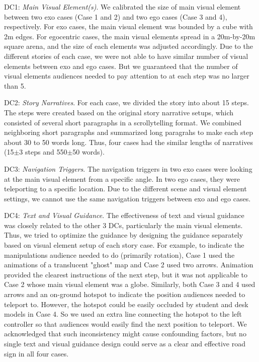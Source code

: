 {DC1: \textit{Main Visual Element(s)}. We calibrated the size of main visual element between two exo cases (Case 1 and 2) and two ego cases (Case 3 and 4), respectively. For exo cases, the main visual element was bounded by a cube with 2m edges. For egocentric cases, the main visual elements spread in a 20m-by-20m square arena, and the size of each elements was adjusted accordingly. Due to the different stories of each case, we were not able to have similar number of visual elements between exo and ego cases. But we guaranteed that the number of visual elements audiences needed to pay attention to at each step was no larger than 5.}

{DC2: \textit{Story Narratives}. For each case, we divided the story into about 15 steps. The steps were created based on the original story narrative setups, which consisted of several short paragraphs in a scrollytelling format. We combined neighboring short paragraphs and summarized long paragrahs to make each step about 30 to 50 words long. Thus, four cases had the similar lengths of narratives (15$\pm$3 steps and 550$\pm$50 words).}

{DC3: \textit{Navigation Triggers}. The navigation triggers in two exo cases were looking at the main visual element from a specific angle. In two ego cases, they were teleporting to a specific location. Due to the different scene and visual element settings, we cannot use the same navigation triggers between exo and ego cases.}

{DC4: \textit{Text and Visual Guidance}. The effectiveness of text and visual guidance was closely related to the other 3 DCs, particularly the main visual elements. Thus, we tried to optimize the guidance by designing the guidance separately based on visual element setup of each story case. For example, to indicate the manipulations audience needed to do (primarily rotation), Case 1 used the animations of a translucent "ghost" map and Case 2 used two arrows. Animation provided the clearest instructions of the next step, but it was not applicable to Case 2 whose main visual element was a globe. Similarly, both Case 3 and 4 used arrows and an on-ground hotspot to indicate the position audiences needed to teleport to. However, the hotspot could be easily occluded by student and desk models in Case 4. So we used an extra line connecting the hotspot to the left controller so that audiences would easily find the next position to teleport. We acknowledged that such inconsistency might cause confounding factors, but no single text and visual guidance design could serve as a clear and effective road sign in all four cases.}

